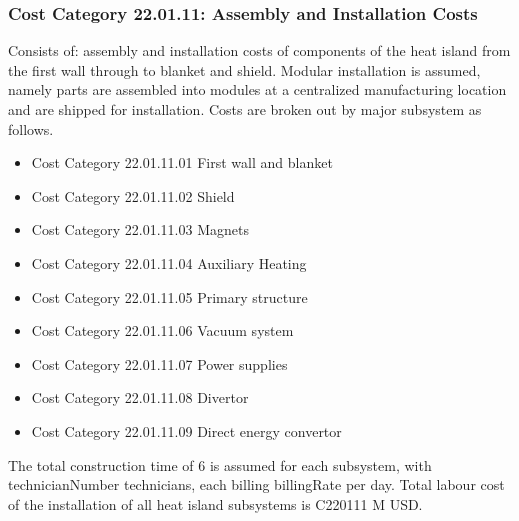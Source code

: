\subsubsection*{Cost Category 22.01.11: Assembly and Installation Costs}

Consists of: assembly and installation costs of components of the heat island from the first wall through to blanket and shield. Modular installation is assumed, namely parts are assembled into modules at a centralized manufacturing location and are shipped for installation. Costs are broken out by major subsystem as follows.

\begin{itemize}
    \item Cost Category 22.01.11.01 First wall and blanket
    \item Cost Category 22.01.11.02 Shield
    \item Cost Category 22.01.11.03 Magnets
    \item Cost Category 22.01.11.04 Auxiliary Heating
    \item Cost Category 22.01.11.05 Primary structure
    \item Cost Category 22.01.11.06 Vacuum system
    \item Cost Category 22.01.11.07 Power supplies
    \item Cost Category 22.01.11.08 Divertor
    \item Cost Category 22.01.11.09 Direct energy convertor
\end{itemize}

The total construction time of 6 is assumed for each subsystem, with technicianNumber technicians, each billing billingRate per day.  Total labour cost of the installation of all heat island subsystems is C220111 M USD.